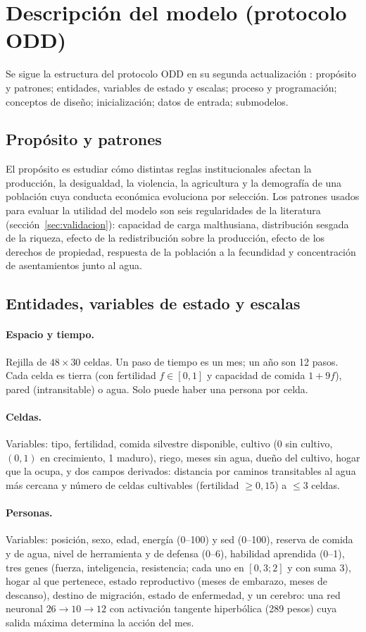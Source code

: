 \documentclass[11pt,a4paper]{article}
\begin{document}
\section{Descripción del modelo (protocolo ODD)}
Se sigue la estructura del protocolo ODD en su segunda actualización \citep{grimm2020odd}: propósito y patrones; entidades, variables de estado y escalas; proceso y programación; conceptos de diseño; inicialización; datos de entrada; submodelos.

\subsection{Propósito y patrones}
El propósito es estudiar cómo distintas reglas institucionales afectan la producción, la desigualdad, la violencia, la agricultura y la demografía de una población cuya conducta económica evoluciona por selección. Los patrones usados para evaluar la utilidad del modelo son seis regularidades de la literatura (sección~\ref{sec:validacion}): capacidad de carga malthusiana, distribución sesgada de la riqueza, efecto de la redistribución sobre la producción, efecto de los derechos de propiedad, respuesta de la población a la fecundidad y concentración de asentamientos junto al agua.

\subsection{Entidades, variables de estado y escalas}
\paragraph{Espacio y tiempo.} Rejilla de $48\times30$ celdas. Un paso de tiempo es un mes; un año son 12 pasos. Cada celda es tierra (con fertilidad $f\in[0,1]$ y capacidad de comida $1+9f$), pared (intransitable) o agua. Solo puede haber una persona por celda.
\paragraph{Celdas.} Variables: tipo, fertilidad, comida silvestre disponible, cultivo (0 sin cultivo, $(0,1)$ en crecimiento, 1 maduro), riego, meses sin agua, dueño del cultivo, hogar que la ocupa, y dos campos derivados: distancia por caminos transitables al agua más cercana y número de celdas cultivables (fertilidad $\ge 0{,}15$) a $\le 3$ celdas.
\paragraph{Personas.} Variables: posición, sexo, edad, energía (0--100) y sed (0--100), reserva de comida y de agua, nivel de herramienta y de defensa (0--6), habilidad aprendida (0--1), tres genes (fuerza, inteligencia, resistencia; cada uno en $[0{,}3; 2]$ y con suma 3), hogar al que pertenece, estado reproductivo (meses de embarazo, meses de descanso), destino de migración, estado de enfermedad, y un cerebro: una red neuronal $26\to10\to12$ con activación tangente hiperbólica (289 pesos) cuya salida máxima determina la acción del mes.
\end{document}
